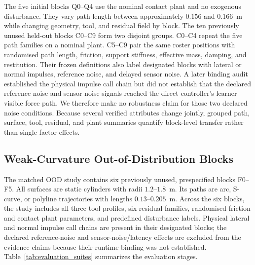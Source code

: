 The five initial blocks Q0--Q4 use the nominal contact plant and
no exogenous disturbance. They vary path length between approximately
$0.156$ and $0.166$~m while changing geometry, tool, and residual field by
block. The ten previously unused held-out blocks C0--C9 form two disjoint
groups. C0--C4 repeat the five path families on a nominal plant. C5--C9
pair the same roster positions with randomised path length, friction,
support stiffness, effective mass, damping, and restitution. Their frozen
definitions also label designated blocks with lateral or normal impulses,
reference noise, and delayed sensor noise. A later binding audit established
the physical impulse call chain but did not establish that the declared
reference-noise and sensor-noise signals reached the direct controller's
learner-visible force path. We therefore make no robustness claim for those
two declared noise conditions. Because several verified attributes change
jointly, grouped path, surface, tool, residual, and plant summaries quantify
block-level transfer rather than single-factor effects.

\subsection{Weak-Curvature Out-of-Distribution Blocks}
\label{subsec:weak_curvature_suite}

The matched OOD study contains six previously unused, prespecified blocks
F0--F5. All surfaces are static cylinders with radii $1.2$--$1.8$~m. Its paths
are arc, S-curve, or polyline trajectories with lengths $0.13$--$0.205$~m.
Across the six blocks, the study includes all three tool profiles, six
residual families, randomised friction and contact plant parameters, and
predefined disturbance labels. Physical lateral and normal impulse call chains
are present in their designated blocks; the declared reference-noise and
sensor-noise/latency effects are excluded from the evidence claims because
their runtime binding was not established. Table~\ref{tab:evaluation_suites}
summarizes the evaluation stages.

